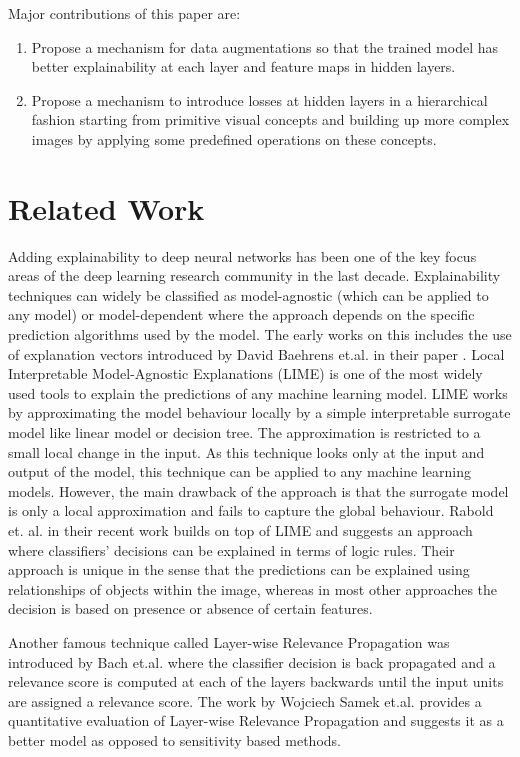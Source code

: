 \documentclass[conference]{IEEEtran}
\begin{document}
Major contributions of this paper are:
\begin{enumerate}
  \item Propose a mechanism for data augmentations so that the trained model has better explainability at each layer and feature maps in hidden layers.
  \item Propose a mechanism to introduce losses at hidden layers in a hierarchical fashion starting from primitive visual concepts and building up more complex images by applying some predefined operations on these concepts.
\end{enumerate}

\section{Related Work}
Adding explainability to deep neural networks has been one of the key focus areas of the deep learning research community in the last decade.
Explainability techniques can widely be classified as model-agnostic (which can be applied to any model) or model-dependent where the approach depends on the specific prediction algorithms used by the model.
The early works on this includes the use of explanation vectors introduced by David Baehrens et.al. in their paper \cite{baehrens2010explain}.
Local Interpretable Model-Agnostic Explanations (LIME) \cite{ribeiro2016should} is one of the most widely used tools to explain the predictions of any machine learning model.
LIME works by approximating the model behaviour locally by a simple interpretable surrogate model like linear model or decision tree. The approximation is restricted to a small local change in the input. As this technique looks only at the input and output of the model, this technique can be applied to any machine learning models.
However, the main drawback of the approach is that the surrogate model is only a local approximation and fails to capture the global behaviour.
Rabold et. al. in their recent work \cite{rabold2019enriching} builds on top of LIME and suggests an approach where classifiers' decisions can be explained in terms of logic rules. Their approach is unique in the sense that the predictions can be explained using relationships of objects within the image, whereas in most other approaches the decision is based on presence or absence of certain features.

Another famous technique called Layer-wise Relevance Propagation was introduced by Bach et.al. \cite{bach2015pixel} where the classifier decision is  back propagated and a relevance score is computed at each of the layers backwards until the input units are assigned a relevance score.
The work by Wojciech Samek et.al. \cite{samek2016evaluating} provides a quantitative  evaluation of Layer-wise Relevance Propagation and  suggests it as a better model as opposed to sensitivity based methods.
\end{document}
